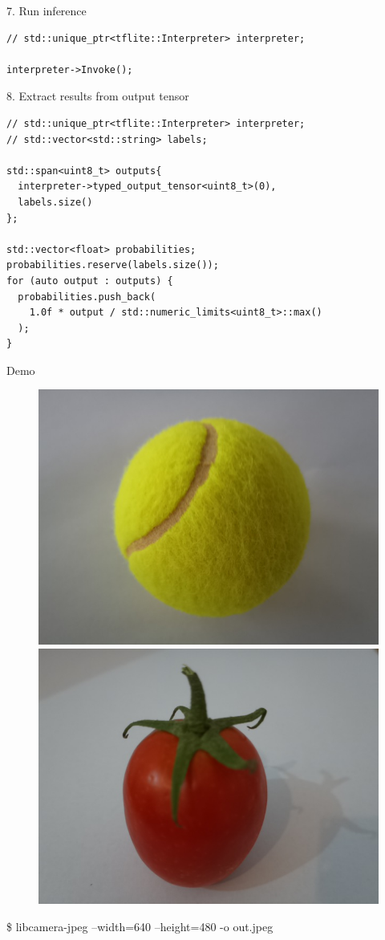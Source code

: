 \begin{frame}[fragile]{7. Run inference}
  \lstset{basicstyle=\ttfamily\small, numbers=left, columns=fullflexible}
  \begin{lstlisting}
// std::unique_ptr<tflite::Interpreter> interpreter;

interpreter->Invoke();
  \end{lstlisting}
\end{frame}

\begin{frame}[fragile]{8. Extract results from output tensor}
  \lstset{basicstyle=\ttfamily\small, numbers=left, columns=fullflexible}
  \begin{lstlisting}
// std::unique_ptr<tflite::Interpreter> interpreter;
// std::vector<std::string> labels;

std::span<uint8_t> outputs{
  interpreter->typed_output_tensor<uint8_t>(0),
  labels.size()
};

std::vector<float> probabilities;
probabilities.reserve(labels.size());
for (auto output : outputs) {
  probabilities.push_back(
    1.0f * output / std::numeric_limits<uint8_t>::max()
  );
}
  \end{lstlisting}
\end{frame}

\begin{frame}{Demo}
  \begin{figure}
	\includegraphics[width=0.5\linewidth,height=0.5\textheight,keepaspectratio]{../images/tennis_ball_input.jpeg}%
	\includegraphics[width=0.5\linewidth,height=0.5\textheight,keepaspectratio]{../images/tomato.jpeg}
  \end{figure}
  \ttfamily \$ libcamera-jpeg --width=640 --height=480 -o out.jpeg
\end{frame}

